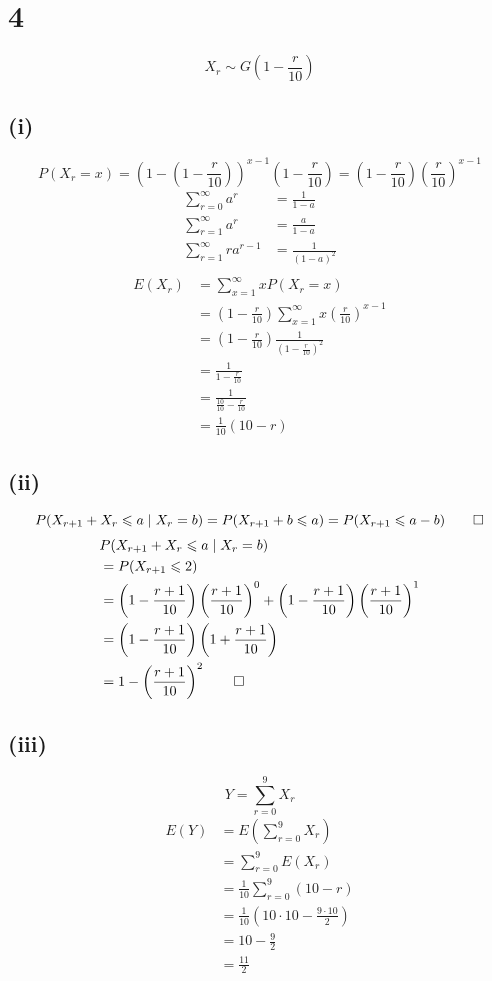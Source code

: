 \documentclass[a4paper]{article}
\begin{document}
\section*{4}
\[X_r\sim G\left(1-\frac r{10}\right)\]
\subsection*{(i)}
\[P(X_r=x)=\left(1-\left(1-\frac r{10}\right)\right)^{x-1}\left(1-\frac r{10}\right)=\boxed{\left(1-\frac r{10}\right)\left(\frac r{10}\right)^{x-1}}\]
\[\begin{aligned}
	\sum\limits_{r=0}^\infty a^r&=\frac1{1-a}\\
	\sum\limits_{r=1}^\infty a^r&=\frac a{1-a}\\
	\sum\limits_{r=1}^\infty ra^{r-1}&=\frac1{(1-a)^2}\\
\end{aligned}\]
\[\begin{aligned}
	E(X_r)&=\sum\limits_{x=1}^\infty xP(X_r=x)\\
	      &=\left(1-\frac r{10}\right)\sum\limits_{x=1}^\infty x\left(\frac r{10}\right)^{x-1}\\
	      &=\left(1-\frac r{10}\right)\frac1{\left(1-\frac r{10}\right)^2}\\
	      &=\frac1{1-\frac r{10}}\\
	      &=\frac1{\frac{10}{10}-\frac r{10}}\\
	      &=\boxed{\frac1{10}(10-r)}
\end{aligned}\]
\subsection*{(ii)}
\[P(X_{r+1}+X_r\leqslant a\mid X_r=b)=P(X_{r+1}+b\leqslant a)=P(X_{r+1}\leqslant a-b)\qed\]
\[\begin{aligned}
	&P(X_{r+1}+X_r\leqslant a\mid X_r=b)\\
	&=P(X_{r+1}\leqslant2)\\
	&=\left(1-\frac{r+1}{10}\right)\left(\frac{r+1}{10}\right)^0+\left(1-\frac{r+1}{10}\right)\left(\frac{r+1}{10}\right)^1\\
	&=\left(1-\frac{r+1}{10}\right)\left(1+\frac{r+1}{10}\right)\\
	&=1-\left(\frac{r+1}{10}\right)^2\qed
\end{aligned}\]
\subsection*{(iii)}
\[Y=\sum\limits_{r=0}^9X_r\]
\[\begin{aligned}
	E(Y)&=E\left(\sum\limits_{r=0}^9X_r\right)\\
	    &=\sum\limits_{r=0}^9E(X_r)\\
	    &=\frac1{10}\sum\limits_{r=0}^9(10-r)\\
	    &=\frac1{10}\left(10\cdot10-\frac{9\cdot10}2\right)\\
	    &=10-\frac92\\
	    &=\boxed{\frac{11}2}
\end{aligned}\]
\end{document}
